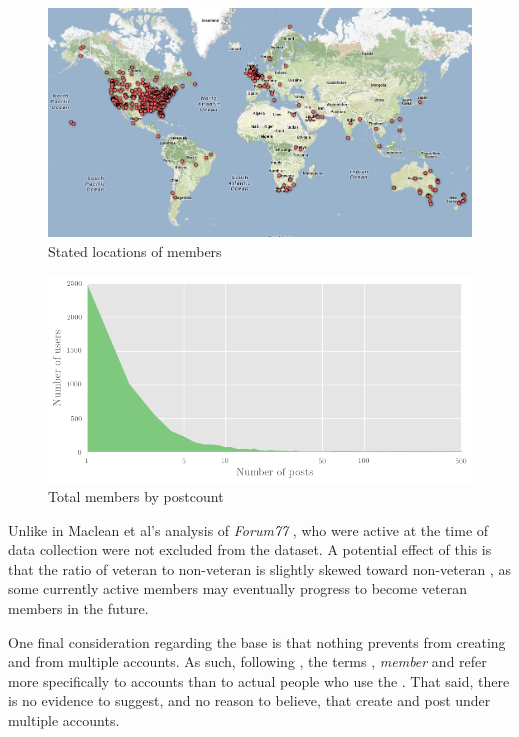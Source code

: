 \begin{figure}[t]
\centering
\includegraphics[width=0.61\linewidth]{../images/map3}
\caption{Stated locations of members}\label{fig:map}
\end{figure}

\begin{figure}[b]
\centering
\includegraphics[width=0.70\linewidth]{../images/best-posts-users}
\caption{Total members by postcount}\label{fig:counts}
\end{figure}

Unlike in Maclean et al's analysis of \emph{Forum77} \parencite*{maclean_forum77:_2015},  who were active at the time of data collection were not excluded from the dataset. A potential effect of this is that the ratio of veteran to non\hyp{}veteran  is slightly skewed toward non\hyp{}veteran , as some currently active members may eventually progress to become veteran members in the future.

One final consideration regarding the  base is that nothing prevents  from creating and  from multiple accounts. As such, following \textcite{de_choudhury_discovering_2016}, the terms \emph{}, \emph{\gls{member}} and \emph{} refer more specifically to  accounts than to actual people who use the . That said, there is no evidence to suggest, and no reason to believe, that  create and \gls{post} under multiple accounts.

